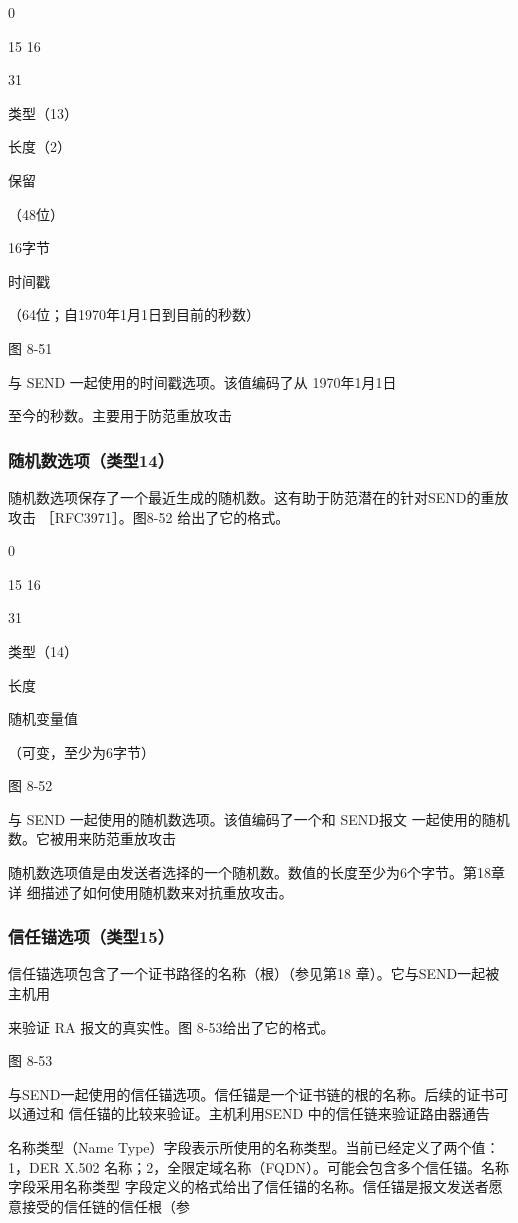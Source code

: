 0

15 16

31

类型（13）

长度（2）

保留

（48位）

16字节

时间戳

（64位；自1970年1月1日到目前的秒数）

图 8-51

与 SEND 一起使用的时间戳选项。该值编码了从 1970年1月1日

至今的秒数。主要用于防范重放攻击

\subsubsection{随机数选项（类型14）}
随机数选项保存了一个最近生成的随机数。这有助于防范潜在的针对SEND的重放攻击
［RFC3971］。图8-52 给出了它的格式。

0

15 16

31

类型（14）

长度

随机变量值

（可变，至少为6字节）

图 8-52

与 SEND 一起使用的随机数选项。该值编码了一个和 SEND报文
一起使用的随机数。它被用来防范重放攻击

随机数选项值是由发送者选择的一个随机数。数值的长度至少为6个字节。第18章详
细描述了如何使用随机数来对抗重放攻击。

\subsubsection{信任锚选项（类型15）}
信任锚选项包含了一个证书路径的名称（根）（参见第18 章）。它与SEND一起被主机用

来验证 RA 报文的真实性。图 8-53给出了它的格式。


图 8-53

与SEND一起使用的信任锚选项。信任锚是一个证书链的根的名称。后续的证书可以通过和
信任锚的比较来验证。主机利用SEND 中的信任链来验证路由器通告

名称类型（Name Type）字段表示所使用的名称类型。当前已经定义了两个值：1，DER
X.502 名称；2，全限定域名称（FQDN）。可能会包含多个信任锚。名称字段采用名称类型
字段定义的格式给出了信任锚的名称。信任锚是报文发送者愿意接受的信任链的信任根（参

